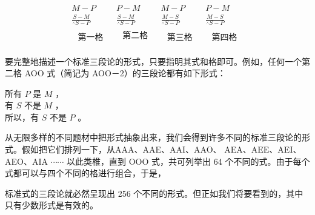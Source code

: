 $$
\begin{array}{llll}
M-P & P-M & M-P & P-M \\
\frac{S-M}{\therefore S-P} & \frac{S-M}{\therefore S-P} & \frac{M-S}{\therefore S-P} & \frac{M-S}{\therefore S-P} \\
\begin{array}{l}
\text { 第一格 }
\end{array} & \begin{array}{l}
\text { 第二格 } \\
\end{array} & \begin{array}{l}
\text { 第三格 }
\end{array} & \begin{array}{l}
\text { 第四格 }
\end{array}
\end{array}
$$

要完整地描述一个标准三段论的形式，只要指明其式和格即可。例如，任何一个第二格 AOO 式（简记为 AOO－2）的三段论都有如下形式：

所有 $P$ 是 $M$ ，\\
有 $S$ 不是 $M$ ，\\
所以，有 $S$ 不是 $P$ 。

从无限多样的不同题材中把形式抽象出来，我们会得到许多不同的标准三段论的形式。假如把它们排列一下，从AAA、AAE、AAI、AAO、 AEA、AEE、AEI、AEO、AIA $\cdots \cdots$ 以此类椎，直到 OOO 式，共可列举出 64 个不同的式。由于每个式都可以与四个不同的格进行组合，于是，

标准式的三段论就必然呈现出 256 个不同的形式。但正如我们将要看到的，其中只有少数形式是有效的。 